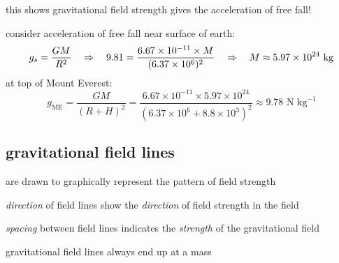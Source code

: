 this shows gravitational field strength gives the acceleration of free fall!


\begin{soln}
    
 consider acceleration of free fall near surface of earth:
\begin{equation*}
	g_s = \frac{GM}{R^2} \quad \Rightarrow \quad 9.81 = \frac{6.67\times10^{-11}\times M}{(6.37\times10^6)^2} \quad \Rightarrow \quad M \approx 5.97\times10^{24} \text{ kg}
\end{equation*}
at top of Mount Everest:
\begin{equation*}
g_\text{ME} = \frac{GM}{(R+H)^2} = \frac{6.67\times10^{-11}\times 5.97\times10^{24}}{(6.37\times10^6+8.8\times10^3)^2} \approx 9.78 \text{ N kg}^{-1} 
\end{equation*}
\end{soln}


\subsection{gravitational field lines}
 are drawn to graphically represent the pattern of field strength

\cmt \emph{direction} of field lines show the \emph{direction} of field strength in the field
	
\cmt \emph{spacing} between field lines indicates the \emph{strength} of the gravitational field
	
\cmt gravitational field lines always end up at a mass


